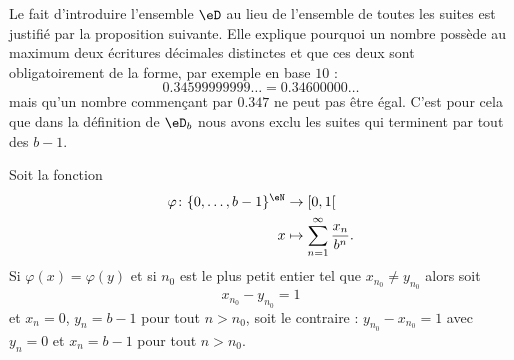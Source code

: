 Le fait d'introduire l'ensemble \( \eD\) au lieu de l'ensemble de toutes les suites est justifié par la proposition suivante. Elle explique pourquoi un nombre possède au maximum deux écritures décimales distinctes et que ces deux sont obligatoirement de la forme, par exemple en base \( 10\) :
\begin{equation}
    0.34599999999\ldots=0.34600000\ldots
\end{equation}
mais qu'un nombre commençant par \( 0.347\) ne peut pas être égal. C'est pour cela que dans la définition de \( \eD_b\) nous avons exclu les suites qui terminent par tout des \( b-1\).
\begin{proposition} \label{PropSAOoofRlQR}
    Soit la fonction
    \begin{equation}
        \begin{aligned}
            \varphi\colon \{ 0,\ldots, b-1 \}^{\eN}&\to \mathopen[ 0 , 1 [ \\
                x&\mapsto \sum_{n=1}^{\infty}\frac{ x_n }{ b^n }. 
        \end{aligned}
    \end{equation}
    Si \( \varphi(x)=\varphi(y)\) et si \( n_0\) est le plus petit entier tel que \( x_{n_0}\neq y_{n_0}\) alors soit
    \begin{equation}
        x_{n_0}-y_{n_0}=1
    \end{equation}
    et \( x_n=0\), \( y_n=b-1\) pour tout \( n>n_0\), soit le contraire : \( y_{n_0}-x_{n_0}=1\) avec \( y_n=0\) et \( x_n=b-1\) pour tout \( n>n_0\).
\end{proposition}


